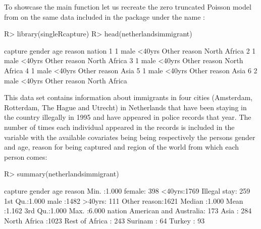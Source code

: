 \documentclass[
]{jss}
\newcommand{\1}{\mathcal{I}} \newcommand{\bx}{\boldsymbol{x}}
\begin{document}
To showcase the main function let us recreate the zero truncated Poisson
model from \cite{ztpoisson} on the same data included in the package
under the name :

\begin{CodeChunk}
\begin{CodeInput}
R> library(singleRcapture)
R> head(netherlandsimmigrant)
\end{CodeInput}
\begin{CodeOutput}
  capture gender    age       reason       nation
1       1   male <40yrs Other reason North Africa
2       1   male <40yrs Other reason North Africa
3       1   male <40yrs Other reason North Africa
4       1   male <40yrs Other reason         Asia
5       1   male <40yrs Other reason         Asia
6       2   male <40yrs Other reason North Africa
\end{CodeOutput}
\end{CodeChunk}

This data set contains information about immigrants in four cities
(Amsterdam, Rotterdam, The Hague and Utrecht) in Netherlands that have
been staying in the country illegally in 1995 and have appeared in
police records that year. The number of times each individual appeared
in the records is included in the  variable with the
available covariates being  being
respectively the persons gender and age, reason for being captured and
region of the world from which each person comes:

\begin{CodeChunk}
\begin{CodeInput}
R> summary(netherlandsimmigrant)
\end{CodeInput}
\begin{CodeOutput}
    capture         gender         age                reason    
 Min.   :1.000   female: 398   <40yrs:1769   Illegal stay: 259  
 1st Qu.:1.000   male  :1482   >40yrs: 111   Other reason:1621  
 Median :1.000                                                  
 Mean   :1.162                                                  
 3rd Qu.:1.000                                                  
 Max.   :6.000                                                  
                    nation    
 American and Australia: 173  
 Asia                  : 284  
 North Africa          :1023  
 Rest of Africa        : 243  
 Surinam               :  64  
 Turkey                :  93  
\end{CodeOutput}
\end{CodeChunk}
\end{document}
